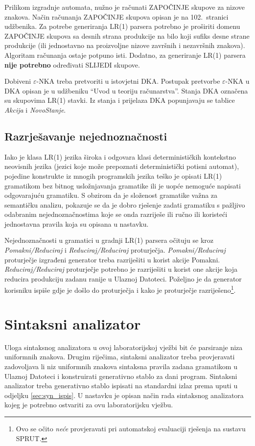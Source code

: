 \documentclass[times, 12pt, utf8]{book}
\begin{document}
Prilikom izgradnje automata, nužno je računati ZAPOČINJE skupove za nizove znakova.
Način računanja ZAPOČINJE skupova opisan je na 102.~stranici udžbenika.
Za potrebe generiranja LR(1) parsera potrebno je proširiti domenu ZAPOČINJE skupova sa desnih strana produkcije na bilo koji sufiks desne strane produkcije (ili jednostavno na proizvoljne nizove završnih i nezavršnih znakova).
Algoritam računanja ostaje potpuno isti.
Dodatno, za generiranje LR(1) parsera \textbf{nije potrebno} određivati SLIJEDI skupove.

Dobiveni $\varepsilon$-NKA treba pretvoriti u istovjetni DKA.
Postupak pretvorbe $\varepsilon$-NKA u DKA opisan je u udžbeniku “Uvod u teoriju računarstva”.
Stanja DKA označena su skupovima LR(1) stavki.
Iz stanja i prijelaza DKA popunjavaju se tablice {\em Akcija} i {\em NovoStanje}.

\subsection{Razrješavanje nejednoznačnosti}
Iako je klasa LR(1) jezika široka i odgovara klasi determinističkih kontekstno neovisnih jezika (jezici koje može prepoznati deterministički potisni automat), pojedine konstrukte iz mnogih programskih jezika teško je opisati LR(1) gramatikom bez bitnog usložnjavanja gramatike ili je uopće nemoguće napisati odgovarajuću gramatiku.
S obzirom da je složenost gramatike važna za semantičku analizu, pokazuje se da je dobro rješenje zadati gramatiku s pažljivo odabranim nejednoznačnostima koje se onda razriješe ili ručno ili koristeći jednostavna pravila koja su opisana u nastavku.

Nejednoznačnosti u gramatici u gradnji LR(1) parsera očituju se kroz {\em Pomakni/Reduciraj} i {\em Reduciraj/Reduciraj} proturječja.
{\em Pomakni/Reduciraj} proturječje izgrađeni generator treba razriješiti u korist akcije Pomakni.
{\em Reduciraj/Reduciraj} proturječje potrebno je razriješiti u korist one akcije koja reducira produkciju zadanu ranije u Ulaznoj Datoteci.
Poželjno je da generator korisniku ispiše gdje je došlo do proturječja i kako je proturječje razriješeno\footnote{Ovo se očito \emph{neće} provjeravati pri automatskoj evaluaciji rješenja na sustavu SPRUT.}.

\section{Sintaksni analizator}
Uloga sintaksnog analizatora u ovoj laboratorijskoj vježbi bit će parsiranje niza uniformnih znakova.
Drugim riječima, sintaksni analizator treba provjeravati zadovoljava li niz uniformnih znakova sintaksna pravila zadana gramatikom u Ulaznoj Datoteci i konstruirati generativno stablo za dani program.
Sintaksni analizator treba generativno stablo ispisati na standardni izlaz prema uputi u odjeljku \ref{sec:syn_ispis}.
U nastavku je opisan način rada sintaksnog analizatora kojeg je potrebno ostvariti za ovu laboratorijsku vježbu.
\end{document}
